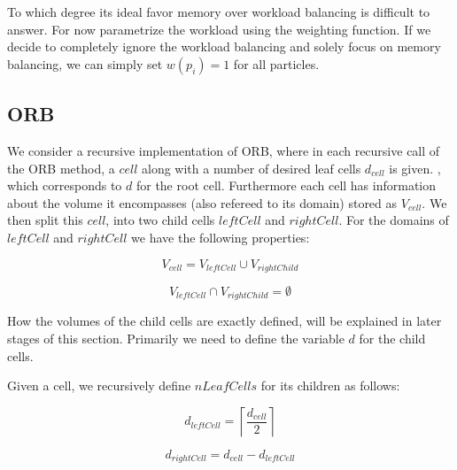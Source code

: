 \documentclass[]{article}
\begin{document}
To which degree its ideal favor memory over workload balancing is difficult to answer. For now parametrize the workload using the weighting function. If we decide to completely ignore the workload balancing and solely focus on memory balancing, we can simply set $w(p_i) = 1$ for all particles.


\subsection{ORB}


We consider a recursive implementation of ORB, where in each recursive call of the ORB method, a $cell$ along with a number of desired leaf cells $d_{cell}$ is given. , which corresponds to $d$ for the root cell. Furthermore each cell has information about the volume it encompasses (also refereed to its domain) stored as $V_{cell}$. We then split this $cell$, into two child cells $leftCell$ and $rightCell$. For the domains of $leftCell$ and $rightCell$ we have the following properties: 

\begin{center}
	\begin{equation}
		V_{cell} = V_{leftCell} \cup V_{rightChild}
	\end{equation}
\end{center}

\begin{center}
	\begin{equation}
		V_{leftCell} \cap V_{rightChild} = \emptyset
	\end{equation}
\end{center}

How the volumes of the child cells are exactly defined, will be explained in later stages of this section. Primarily we need to define the variable $d$ for the child cells.

Given a cell, we recursively define $nLeafCells$ for its children as follows:

\begin{center}
	\begin{equation}
		d_{leftCell} = \left \lceil\frac{d_{cell}}{2} \right \rceil 
	\end{equation}
\end{center}

\begin{center}
	\begin{equation}
		d_{rightCell} = d_{cell} - d_{leftCell}
	\end{equation}
\end{center}
\end{document}
